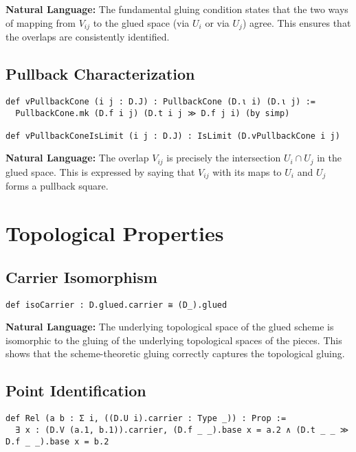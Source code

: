 \documentclass{article}
\theoremstyle{definition}
\begin{document}
\textbf{Natural Language:} The fundamental gluing condition states that the two ways of mapping from $V_{ij}$ to the glued space (via $U_i$ or via $U_j$) agree. This ensures that the overlaps are consistently identified.

\subsection{Pullback Characterization}

\begin{lstlisting}
def vPullbackCone (i j : D.J) : PullbackCone (D.ι i) (D.ι j) :=
  PullbackCone.mk (D.f i j) (D.t i j ≫ D.f j i) (by simp)

def vPullbackConeIsLimit (i j : D.J) : IsLimit (D.vPullbackCone i j)
\end{lstlisting}

\textbf{Natural Language:} The overlap $V_{ij}$ is precisely the intersection $U_i \cap U_j$ in the glued space. This is expressed by saying that $V_{ij}$ with its maps to $U_i$ and $U_j$ forms a pullback square.

\section{Topological Properties}

\subsection{Carrier Isomorphism}

\begin{lstlisting}
def isoCarrier : D.glued.carrier ≅ (D_).glued
\end{lstlisting}

\textbf{Natural Language:} The underlying topological space of the glued scheme is isomorphic to the gluing of the underlying topological spaces of the pieces. This shows that the scheme-theoretic gluing correctly captures the topological gluing.

\subsection{Point Identification}

\begin{lstlisting}
def Rel (a b : Σ i, ((D.U i).carrier : Type _)) : Prop :=
  ∃ x : (D.V (a.1, b.1)).carrier, (D.f _ _).base x = a.2 ∧ (D.t _ _ ≫ D.f _ _).base x = b.2
\end{lstlisting}
\end{document}
